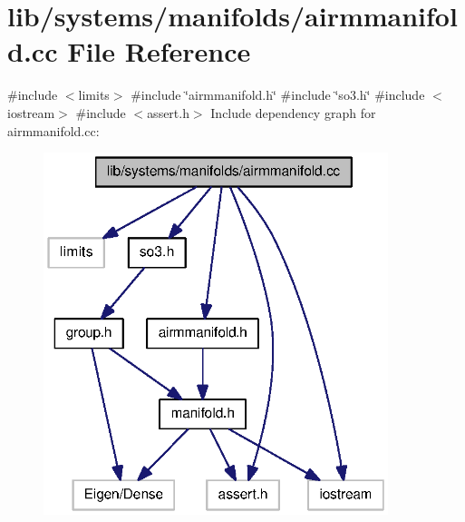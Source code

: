 \section{lib/systems/manifolds/airmmanifold.cc \-File \-Reference}
\label{airmmanifold_8cc}
{\ttfamily \#include $<$limits$>$}\*
{\ttfamily \#include \char`\"{}airmmanifold.\-h\char`\"{}}\*
{\ttfamily \#include \char`\"{}so3.\-h\char`\"{}}\*
{\ttfamily \#include $<$iostream$>$}\*
{\ttfamily \#include $<$assert.\-h$>$}\*
\-Include dependency graph for airmmanifold.\-cc\-:\nopagebreak
\begin{figure}[H]
\begin{center}
\leavevmode
\includegraphics[width=285pt]{airmmanifold_8cc__incl}
\end{center}
\end{figure}
